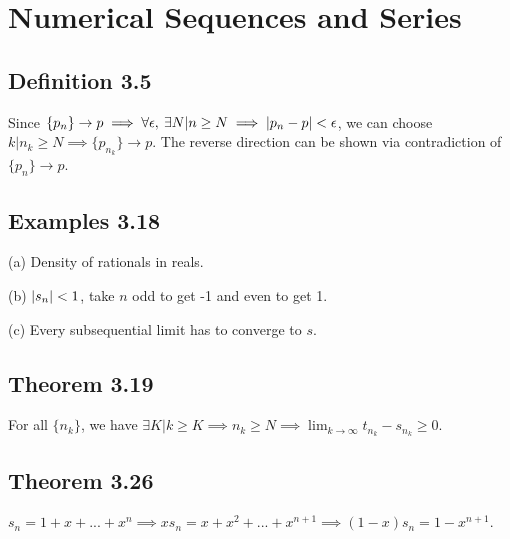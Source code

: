 \section{Numerical Sequences and Series}

\subsection*{Definition 3.5}
Since $\{p_n\} \to p \implies \forall \epsilon, \: \exists N | n \geq N \implies \abs{p_n - p} < \epsilon$,
we can choose $k | n_k \geq N \implies \{p_{n_k}\} \to p$.
The reverse direction can be shown via contradiction of $\{p_n\} \to p$.

\subsection*{Examples 3.18}
(a) Density of rationals in reals.

(b) $\abs{s_n} < 1$, take $n$ odd to get -1 and even to get 1.

(c) Every subsequential limit has to converge to $s$.

\subsection*{Theorem 3.19}
For all $\{n_k\}$, we have $\exists K | k \geq K \implies  n_k \geq N \implies \lim_{k \to \infty} t_{n_k} - s_{n_k} \geq 0$.

\subsection*{Theorem 3.26}
$s_n = 1 + x + ... + x^n \implies x s_n = x + x^2 + ... + x^{n+1} \implies (1 - x) s_n = 1 - x^{n+1}$.
